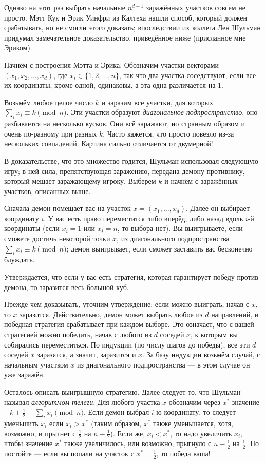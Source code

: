 Однако на этот раз выбрать начальные $n^{d-1}$ заражённых участков совсем не просто.
Мэтт Кук и Эрик Уинфри из Калтеха нашли способ, который должен срабатывать, но не смогли этого доказать;
впоследствии их коллега Лен Шульман придумал замечательное доказательство, приведённое ниже (присланное мне Эриком).

Начнём с построения Мэтта и Эрика.
Обозначим участки векторами $(x_1 , x_2 , \dots , x_d )$, где $x_i \in \{1, 2, \dots , n\}$, так что два участка соседствуют, 
если все их координаты, кроме одной, одинаковы, а эта одна различается на $1$.

Возьмём любое целое число $k$ и заразим все участки, для которых $\sum_i x_i \equiv k\pmod n$.
Эти участки образуют \emph{диагональное подпространство}, оно разбивается на несколько кусков.
Они всё заражают, но странным образом и очень по-разному при разных $k$.
Часто кажется, что просто повезло из-за нескольких совпадений. 
Картина сильно отличается от двумерной!

В доказательстве, что это множество годится, Шульман использовал следующую игру;
в ней сила, препятствующая заражению, передана демону-противнику, который мешает заражающему игроку.
Выберем $k$ и начнём с заражённых участков, описанных выше.

Сначала демон помещает вас на участок $x = (x_1, \dots,x_d )$.
Далее он выбирает координату $i$.
У вас есть право переместится либо вперёд, либо назад вдоль $i$-й координаты (если $x_i=1$ или $x_i=n$, то выбора нет).
Вы выигрываете, если сможете достичь некоторой точки $x$, из диагонального подпространства $\sum_i x_i \equiv k\pmod n$;
демон выигрывает, если сможет заставить вас бесконечно блуждать.

Утверждается, что если у вас есть стратегия, которая гарантирует победу против демона, то заразится весь большой куб.

Прежде чем доказывать, уточним утверждение: если можно выиграть, начав с $x$, то $x$ заразится.
Действительно, демон может выбрать любое из $d$ направлений,
и победная стратегия срабатывает при каждом выборе.
Это означает, что с вашей стратегией можно победить, начав с любого из $d$ соседей $x$, к которым вы собирались переместиться.
По индукции (по числу шагов до победы), все эти $d$ соседей $x$ заразятся, а значит, заразится и $x$.
За базу индукции возьмём случай, с начальным участком $x$ из диагонального подпространства --- в этом случае он уже заражён.

Осталось описать выигрышную стратегию.
Далее следует то, что Шульман называл \emph{алгоритмом телеги}.
Для любого участка $x$ обозначим через $x^*$ значение $-k + \tfrac12 + \sum_i x_i \pmod n$.
Если демон выбрал $i$-ю координату, то следует уменьшить $x_i$ если $x_i > x^*$ (таким образом, $x^*$ также уменьшается, хотя, возможно, и прыгнет с $\tfrac12$ на $n - \tfrac12$).
Если же, $x_i < x^*$, то надо увеличить $x_i$, чтобы значение $x^*$ также увеличилось, или возможно, прыгнуло с $n - \tfrac12$ на $\tfrac12$.
Но постойте --- если вы попали на участок с $x^* = \tfrac12$, то победа ваша!

